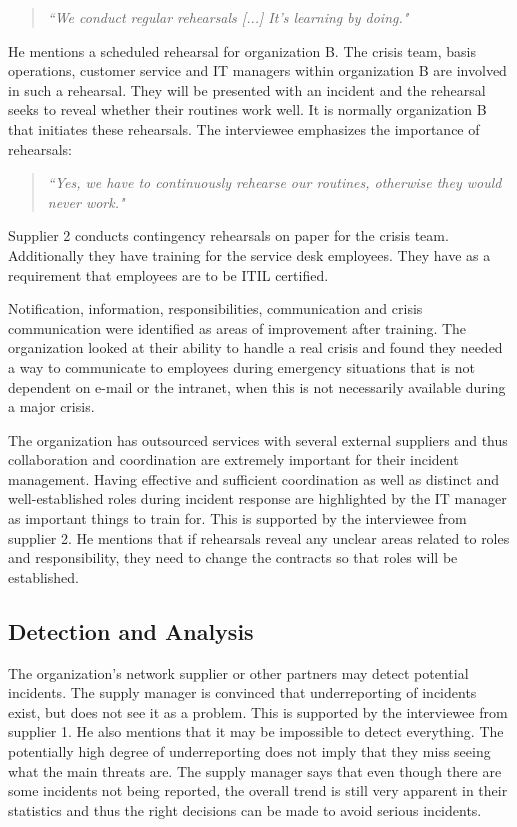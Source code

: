 \begin{quote}
\textit{``We conduct regular rehearsals [...] It's learning by doing."}
\end{quote}

He mentions a scheduled rehearsal for organization B. The crisis team, basis operations, customer service and IT managers within organization B are involved in such a rehearsal. They will be presented with an incident and the rehearsal seeks to reveal whether their routines work well. It is normally organization B that initiates these rehearsals. The interviewee emphasizes the importance of rehearsals:

\begin{quote}
\textit{``Yes, we have to continuously rehearse our routines, otherwise they would never work."}
\end{quote}

Supplier 2 conducts contingency rehearsals on paper for the crisis team. Additionally they have training for the service desk employees. They have as a requirement that employees are to be \ac{ITIL} certified.

Notification, information, responsibilities, communication and crisis communication were identified as areas of improvement after training. The organization looked at their ability to handle a real crisis and found they needed a way to communicate to employees during emergency situations that is not dependent on e-mail or the intranet, when this is not necessarily available during a major crisis.

The organization has outsourced services with several external suppliers and thus collaboration and coordination are extremely important for their incident management. Having effective and sufficient coordination as well as distinct and well-established roles during incident response are highlighted by the IT manager as important things to train for. This is supported by the interviewee from supplier 2. He mentions that if rehearsals reveal any unclear areas related to roles and responsibility, they need to change the contracts so that roles will be established.

\subsection{Detection and Analysis}
The organization's network supplier or other partners may detect potential incidents. The supply manager is convinced that underreporting of incidents exist, but does not see it as a problem. This is supported by the interviewee from supplier 1. He also mentions that it may be impossible to detect everything. The potentially high degree of underreporting does not imply that they miss seeing what the main threats are. The supply manager says that even though there are some incidents not being reported, the overall trend is still very apparent in their statistics and thus the right decisions can be made to avoid serious incidents. 

